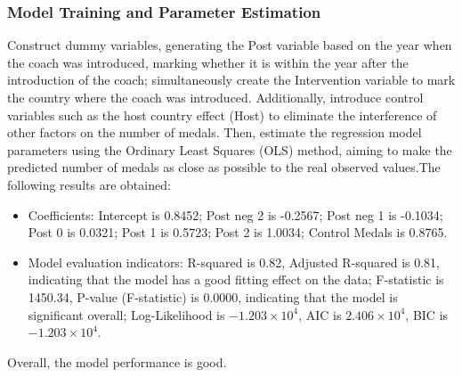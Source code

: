 \documentclass{mcmthesis}  %
\begin{document}
\subsubsection{Model Training and Parameter Estimation}  %
\hspace*{1.5em}Construct dummy variables, generating the Post variable based on the year when the coach was introduced, marking whether it is within the year after the introduction of the coach; simultaneously create the Intervention variable to mark the country where the coach was introduced. Additionally, introduce control variables such as the host country effect (Host) to eliminate the interference of other factors on the number of medals. Then, estimate the regression model parameters using the Ordinary Least Squares (OLS) method, aiming to make the predicted number of medals as close as possible to the real observed values.The following results are obtained:
\begin{itemize}  %
\item Coefficients: Intercept is 0.8452; Post neg 2 is -0.2567; Post neg 1 is -0.1034; Post 0 is 0.0321; Post 1 is 0.5723; Post 2 is 1.0034; Control Medals is 0.8765.
\item Model evaluation indicators: R-squared is 0.82, Adjusted R-squared is 0.81, indicating that the model has a good fitting effect on the data; F-statistic is 1450.34, P-value (F-statistic) is 0.0000, indicating that the model is significant overall; Log-Likelihood is $-1.203\times 10^{4}$, AIC is $2.406\times 10^{4}$, BIC is $-1.203\times 10^{4}$.
\end{itemize}  %
\hspace*{1.5em}Overall, the model performance is good.
\end{document}
